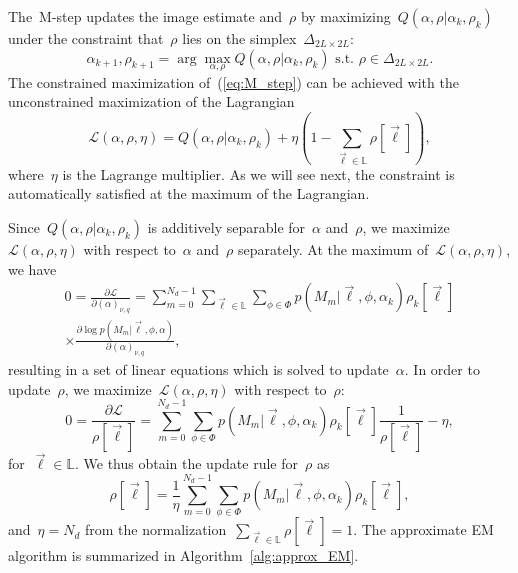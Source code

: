 \documentclass{article}
\begin{document}
The~\mbox{M-step} updates the image estimate and~$\rho$ by maximizing~$Q(\alpha, \rho|\alpha_k, \rho_k)$ under the constraint that~$\rho$ lies on the simplex~$\Delta_{2L \times 2L}$:
\begin{equation}
\label{eq:M_step}
\alpha_{k+1}, \rho_{k+1} = \arg \max_{\alpha, \rho} Q(\alpha, \rho|\alpha_k, \rho_k) \text{ s.t. } \rho \in \Delta_{2L \times 2L}.
\end{equation}
The constrained maximization of~(\ref{eq:M_step}) can be achieved with the unconstrained maximization of the Lagrangian
\begin{equation}
\mathcal{L}(\alpha, \rho, \eta) = Q(\alpha, \rho|\alpha_k, \rho_k) + \eta \left(1 - \sum_{\vec{\ell} \in \mathbb{L}} \rho[\vec{\ell}] \right),
\end{equation}
where~$\eta$ is the Lagrange multiplier. As we will see next, the constraint is automatically satisfied at the   maximum of the Lagrangian.

 Since~$Q(\alpha, \rho|\alpha_k, \rho_k)$ is additively separable for~$\alpha$ and~$\rho$, we maximize~$\mathcal{L}(\alpha, \rho, \eta)$ with respect to~$\alpha$ and~$\rho$ separately. At the maximum of~$\mathcal{L}(\alpha, \rho, \eta)$, we have
\begin{multline}
\label{eq:update_alpha}
0 = \frac{\partial \mathcal{L}}{\partial{(\alpha)_{\nu, q}}} =  \sum_{m = 0}^{N_d - 1} \sum_{\vec{\ell} \in \mathbb{L}} \sum_{\phi \in \Phi} p(M_m|\vec{\ell}, \phi, \alpha_k) \rho_k[\vec{\ell}] \\ \times \frac{\partial \log p(M_m|\vec{\ell}, \phi, \alpha)}{\partial{(\alpha)_{\nu, q}}},
\end{multline}
resulting in a set of linear equations which is solved to update~$\alpha$. In order to update~$\rho$, we maximize~$\mathcal{L}(\alpha, \rho, \eta)$ with
respect to~$\rho$:
\begin{equation}
0 = \frac{\partial \mathcal{L}}{\mathcal \rho[\vec{\ell}]} = \sum_{m = 0}^{N_d - 1} \sum_{\phi \in \Phi} p(M_m|\vec{\ell}, \phi, \alpha_k) \rho_k[\vec{\ell}] \frac{1}{\rho[\vec{\ell}]} - \eta,
\end{equation}
for~$\vec{\ell} \in \mathbb{L}$. We thus obtain the update rule for~$\rho$ as
\begin{equation}
\label{eq:update_rho}
\rho[\vec{\ell}] = \frac{1}{\eta} \sum_{m = 0}^{N_d - 1} \sum_{\phi \in \Phi} p(M_m|\vec{\ell}, \phi, \alpha_k) \rho_k[\vec{\ell}],
\end{equation}
and~$\eta = N_d$ from the normalization~\mbox{$\sum_{\vec{\ell} \in \mathbb{L}} \rho[\vec{\ell}] = 1$}. The approximate EM algorithm is summarized in Algorithm~\ref{alg:approx_EM}.
\end{document}
